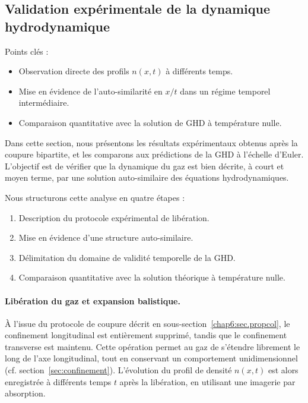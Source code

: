 \subsection{Validation expérimentale de la dynamique hydrodynamique}
\label{sec.don_exp}

{\color{blue}
Points clés :
\begin{itemize}
	\item Observation directe des profils $n(x,t)$ à différents temps.
	\item Mise en évidence de l’auto-similarité en $x/t$ dans un régime temporel intermédiaire.
	\item Comparaison quantitative avec la solution de GHD à température nulle.
\end{itemize}
}


Dans cette section, nous présentons les résultats expérimentaux obtenus après la coupure bipartite, et les comparons aux prédictions de la GHD à l’échelle d’Euler. L’objectif est de vérifier que la dynamique du gaz est bien décrite, à court et moyen terme, par une solution auto-similaire des équations hydrodynamiques.

{\color{blue}
Nous structurons cette analyse en quatre étapes :
\begin{enumerate}
    \item Description du protocole expérimental de libération.
    \item Mise en évidence d’une structure auto-similaire.
    \item Délimitation du domaine de validité temporelle de la GHD.
    \item Comparaison quantitative avec la solution théorique à température nulle.
\end{enumerate}
}

\paragraph{Libération du gaz et expansion balistique.}

À l’issue du protocole de coupure décrit en sous-section~\ref{chap6:sec.propcol}, le confinement longitudinal est entièrement supprimé, tandis que le confinement transverse est maintenu. Cette opération permet au gaz de s’étendre librement le long de l’axe longitudinal, tout en conservant un comportement unidimensionnel (cf. section~\ref{sec:confinement}).
L’évolution du profil de densité $n(x,t)$ est alors enregistrée à différents temps $t$ après la libération, en utilisant une imagerie par absorption.

